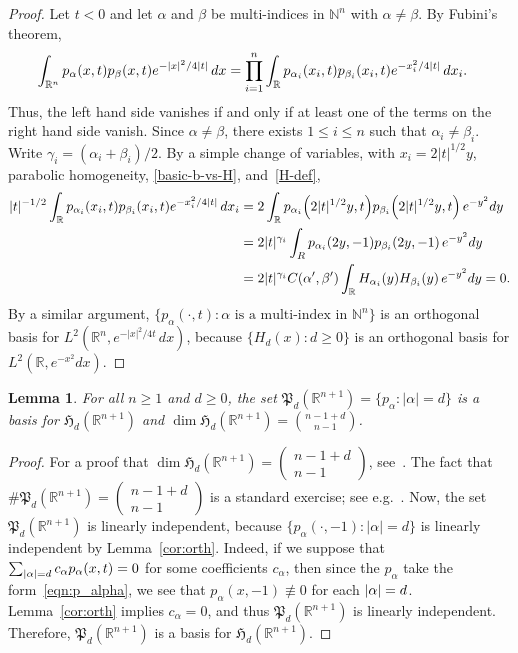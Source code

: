 \documentclass[10pt]{amsart}
\newtheorem{lemm}[theo]{Lemma}\newtheorem{prop}[theo]{Proposition}\newtheorem{coro}[theo]{Corollary}\newtheorem{conj}[theo]{Conjecture}
\theoremstyle{definition}\newtheorem{defi}[theo]{Definition}\newtheorem{rema}[theo]{Remark}\newtheorem{exam}[theo]{Example}\newtheorem{exem}[theo]{Example}\newtheorem{nota}[theo]{Notation}
\newcommand{\N}{\mathbb{N}}
\newcommand{\R}{\mathbb{R}}
\newcommand{\abs}[1]{\left \lvert #1 \right \rvert}
\newcommand{\HCP}[1]{\mathfrak{H}_{#1}}
\newcommand{\fkP}{\mathfrak{P}}
\let\originalleft\left
\let\originalright\right
\renewcommand{\left}{\mathopen{}\mathclose\bgroup\originalleft}
\renewcommand{\right}{\aftergroup\egroup\originalright}
\begin{document}
\begin{proof}
Let $t<0$ and let $\alpha$ and $\beta$ be multi-indices in $\N^n$ with $\alpha\neq\beta$. By Fubini's theorem,
\begin{align*}
\int_{\R^n} p_\alpha(x,t) p_\beta(x,t) e^{-\abs{x}^2/ 4\abs{t}} \, dx & = \prod_{i=1}^n \int_{\R} p_{\alpha_i}(x_i, t) p_{\beta_i}(x_i,t) e^{-x_i^2 / 4 \abs{t}} \, dx_i.
\end{align*}
Thus, the left hand side vanishes if and only if at least one of the terms on the right hand side vanish. Since $\alpha\neq\beta$, there exists $1\leq i\leq n$ such that $\alpha_i\neq \beta_i$. Write $\gamma_i=(\alpha_i+\beta_i)/2$. By a simple change of variables, with $x_i=2|t|^{1/2}y$, parabolic homogeneity, \eqref{basic-b-vs-H}, and~\eqref{H-def},
\begin{align*}
|t|^{-1/2}\int_{\R} p_{\alpha_i}(x_i, t) p_{\beta_i}(x_i,t) e^{-x_i^2 / 4 \abs{t}} \, dx_i &= 2\int_\R p_{\alpha_i}\left(2|t|^{1/2}y,t\right) p_{\beta_i}\left(2|t|^{1/2}y,t\right)\,e^{-y^2}dy\\ &=2|t|^{\gamma_i}\int_R p_{\alpha_i}(2y,-1) p_{\beta_i}(2y,-1)\,e^{-y^2}dy\\
&=2|t|^{\gamma_i}C(\alpha',\beta')\int_{\R}H_{\alpha_i}(y) H_{\beta_i}(y)\,e^{-y^2}dy=0.
\end{align*}
By a similar argument, $\{p_\alpha(\cdot,t):\alpha\text{ is a multi-index in }\N^n\}$ is an orthogonal basis for $L^2(\R^n,e^{-|x|^2/4t}\,dx)$, because $\{H_d(x):d\geq 0\}$ is an orthogonal basis for\linebreak $L^2(\R, e^{-x^2}dx)$.
\end{proof}

\begin{lemm}\label{lem:gen}
For all $n\geq 1$ and $d\geq 0$, the set $\fkP_{d}(\R^{n+1})=\{p_\alpha:|\alpha|=d\}$ is a basis for $\HCP{d}(\R^{n+1})$ and $\dim \HCP{d}(\R^{n+1})=\binom{n-1+d}{n-1}$.
\end{lemm}

\begin{proof}
For a proof that $\dim \HCP{d}(\R^{n+1})=(
\begin{smallmatrix}
n-1+d\\n-1
\end{smallmatrix})$, see~\cite[Lemma~2.2]{CM21}. The fact that $\#\fkP_d(\R^{n+1})=(
\begin{smallmatrix}
n-1+d\\
n-1
\end{smallmatrix})$ is a standard exercise; see e.g.~\cite[p.~12]{Evans-PDE}. Now, the set $\fkP_{d}(\R^{n+1})$ is linearly independent, because $\{p_{\alpha}(\cdot,-1):|\alpha|=d\}$ is linearly independent by Lemma~\ref{cor:orth}. {Indeed, if we suppose that $\sum_{\abs{\alpha} = d} c_\alpha p_\alpha(x,t) = 0$ for some coefficients $c_\alpha$, then since the $p_\alpha$ take the form~\eqref{eqn:p_alpha}, we see that $p_\alpha(x,-1) \not \equiv 0$ for each $\abs{\alpha} = d$. Lemma~\ref{cor:orth} implies $c_\alpha =0$, and thus $\fkP_d(\R^{n+1})$ is linearly independent.} Therefore, $\fkP_d(\R^{n+1})$ is a basis for $\HCP{d}(\R^{n+1})$.
\end{proof}
\end{document}
